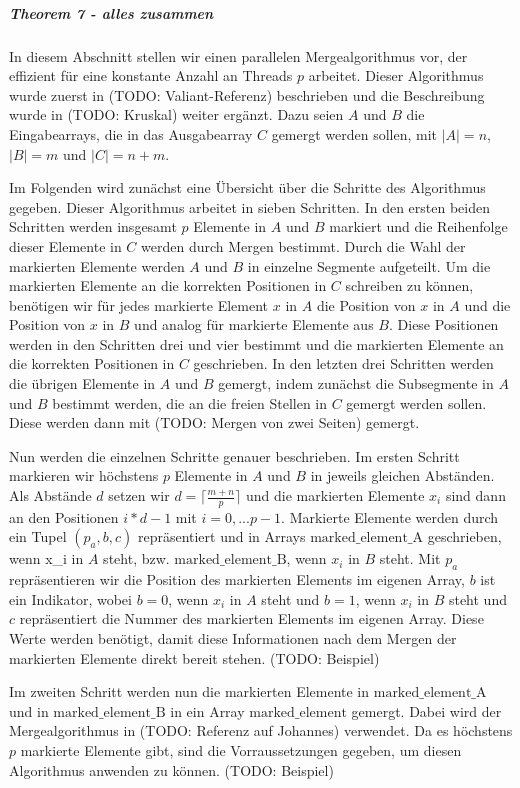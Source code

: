 \subparagraph*{Theorem 7 - alles zusammen}

In diesem Abschnitt stellen wir einen parallelen Mergealgorithmus vor, der effizient für eine konstante Anzahl an Threads $p$ arbeitet. Dieser Algorithmus wurde zuerst in (TODO: Valiant-Referenz) beschrieben und die Beschreibung wurde in (TODO: Kruskal) weiter ergänzt. Dazu seien $A$ und $B$ die Eingabearrays, die in das Ausgabearray $C$ gemergt werden sollen, mit $|A|=n$, $|B|=m$ und $|C|=n+m$.

Im Folgenden wird zunächst eine Übersicht über die Schritte des Algorithmus gegeben. Dieser Algorithmus arbeitet in sieben Schritten. In den ersten beiden Schritten werden insgesamt $p$ Elemente in $A$ und $B$ markiert und die Reihenfolge dieser Elemente in $C$ werden durch Mergen bestimmt. Durch die Wahl der markierten Elemente werden $A$ und $B$ in einzelne Segmente aufgeteilt. Um die markierten Elemente an die korrekten Positionen in $C$ schreiben zu können, benötigen wir für jedes markierte Element $x$ in $A$ die Position von $x$ in $A$ und die Position von $x$ in $B$ und analog für markierte Elemente aus $B$. Diese Positionen werden in den Schritten drei und vier bestimmt und die markierten Elemente an die korrekten Positionen in $C$ geschrieben.
In den letzten drei Schritten werden die übrigen Elemente in $A$ und $B$ gemergt, indem zunächst die Subsegmente in $A$ und $B$ bestimmt werden, die an die freien Stellen in $C$ gemergt werden sollen. Diese werden dann mit (TODO: Mergen von zwei Seiten) gemergt.

Nun werden die einzelnen Schritte genauer beschrieben. Im ersten Schritt markieren wir höchstens $p$ Elemente in $A$ und $B$ in jeweils gleichen Abständen. Als Abstände $d$ setzen wir $d = \lceil \frac{m+n}{p} \rceil$ und die markierten Elemente $x_i$ sind dann an den Positionen $i*d-1$ mit $i = 0,...p-1$. Markierte Elemente werden durch ein Tupel $(p_a, b, c)$ repräsentiert und in Arrays $\text{marked_element_A}$ geschrieben, wenn x_i in $A$ steht, bzw. $\text{marked_element_B}$, wenn $x_i$ in $B$ steht. Mit $p_a$ repräsentieren wir die Position des markierten Elements im eigenen Array, $b$ ist ein Indikator, wobei $b = 0$, wenn $x_i$ in $A$ steht und $b = 1$, wenn $x_i$ in $B$ steht und $c$ repräsentiert die Nummer des markierten Elements im eigenen Array. Diese Werte werden benötigt, damit diese Informationen nach dem Mergen der markierten Elemente direkt bereit stehen.
(TODO: Beispiel)

Im zweiten Schritt werden nun die markierten Elemente in $\text{marked_element_A}$ und in $\text{marked_element_B}$ in ein Array $\text{marked_element}$ gemergt. Dabei wird der Mergealgorithmus in (TODO: Referenz auf Johannes) verwendet. Da es höchstens $p$ markierte Elemente gibt, sind die Vorraussetzungen gegeben, um diesen Algorithmus anwenden zu können.
(TODO: Beispiel)

